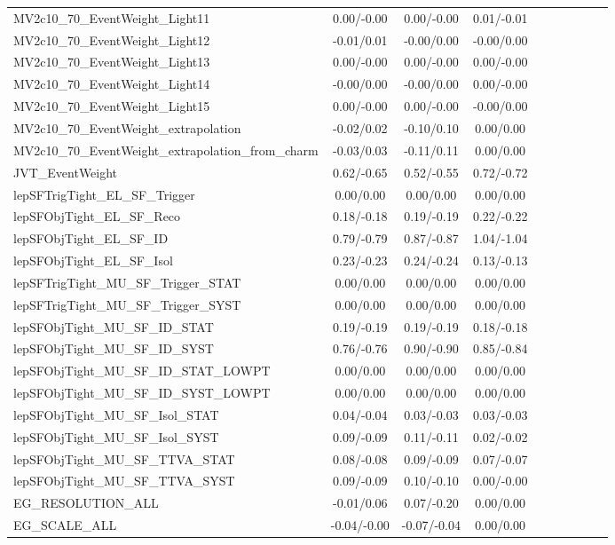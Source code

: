 \begin{table}[h]
\begin{center}
\begin{tabular}{l|ccccccccc}
MV2c10\_70\_EventWeight\_Light11 &0.00/-0.00 &0.00/-0.00 &0.01/-0.01 \\
MV2c10\_70\_EventWeight\_Light12 &-0.01/0.01 &-0.00/0.00 &-0.00/0.00 \\
MV2c10\_70\_EventWeight\_Light13 &0.00/-0.00 &0.00/-0.00 &0.00/-0.00 \\
MV2c10\_70\_EventWeight\_Light14 &-0.00/0.00 &-0.00/0.00 &0.00/-0.00 \\
MV2c10\_70\_EventWeight\_Light15 &0.00/-0.00 &0.00/-0.00 &-0.00/0.00 \\
MV2c10\_70\_EventWeight\_extrapolation &-0.02/0.02 &-0.10/0.10 &0.00/0.00 \\
MV2c10\_70\_EventWeight\_extrapolation\_from\_charm &-0.03/0.03 &-0.11/0.11 &0.00/0.00 \\
JVT\_EventWeight &0.62/-0.65 &0.52/-0.55 &0.72/-0.72 \\
lepSFTrigTight\_EL\_SF\_Trigger &0.00/0.00 &0.00/0.00 &0.00/0.00 \\
lepSFObjTight\_EL\_SF\_Reco &0.18/-0.18 &0.19/-0.19 &0.22/-0.22 \\
lepSFObjTight\_EL\_SF\_ID &0.79/-0.79 &0.87/-0.87 &1.04/-1.04 \\
lepSFObjTight\_EL\_SF\_Isol &0.23/-0.23 &0.24/-0.24 &0.13/-0.13 \\
lepSFTrigTight\_MU\_SF\_Trigger\_STAT &0.00/0.00 &0.00/0.00 &0.00/0.00 \\
lepSFTrigTight\_MU\_SF\_Trigger\_SYST &0.00/0.00 &0.00/0.00 &0.00/0.00 \\
lepSFObjTight\_MU\_SF\_ID\_STAT &0.19/-0.19 &0.19/-0.19 &0.18/-0.18 \\
lepSFObjTight\_MU\_SF\_ID\_SYST &0.76/-0.76 &0.90/-0.90 &0.85/-0.84 \\
lepSFObjTight\_MU\_SF\_ID\_STAT\_LOWPT &0.00/0.00 &0.00/0.00 &0.00/0.00 \\
lepSFObjTight\_MU\_SF\_ID\_SYST\_LOWPT &0.00/0.00 &0.00/0.00 &0.00/0.00 \\
lepSFObjTight\_MU\_SF\_Isol\_STAT &0.04/-0.04 &0.03/-0.03 &0.03/-0.03 \\
lepSFObjTight\_MU\_SF\_Isol\_SYST &0.09/-0.09 &0.11/-0.11 &0.02/-0.02 \\
lepSFObjTight\_MU\_SF\_TTVA\_STAT &0.08/-0.08 &0.09/-0.09 &0.07/-0.07 \\
lepSFObjTight\_MU\_SF\_TTVA\_SYST &0.09/-0.09 &0.10/-0.10 &0.00/-0.00 \\
EG\_RESOLUTION\_ALL &-0.01/0.06 &0.07/-0.20 &0.00/0.00 \\
EG\_SCALE\_ALL &-0.04/-0.00 &-0.07/-0.04 &0.00/0.00 \\

\end{tabular}
\end{center}
\end{table}
